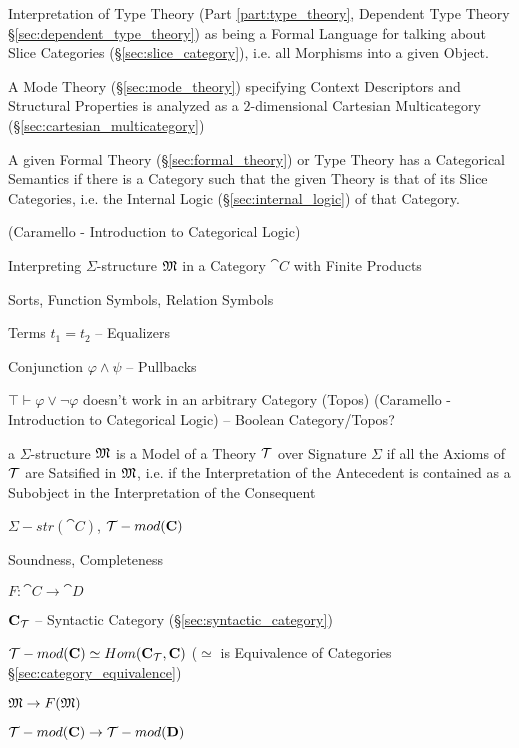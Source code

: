Interpretation of Type Theory (Part \ref{part:type_theory}, Dependent
Type Theory \S\ref{sec:dependent_type_theory}) as being a Formal
Language for talking about Slice Categories
(\S\ref{sec:slice_category}), i.e. all Morphisms into a given Object.

A Mode Theory (\S\ref{sec:mode_theory}) specifying Context Descriptors
and Structural Properties is analyzed as a $2$-dimensional Cartesian
Multicategory (\S\ref{sec:cartesian_multicategory})

A given Formal Theory (\S\ref{sec:formal_theory}) or Type Theory has a
Categorical Semantics if there is a Category such that the given
Theory is that of its Slice Categories, i.e. the Internal Logic
(\S\ref{sec:internal_logic}) of that Category.


\asterism


(Caramello - Introduction to Categorical Logic) %

Interpreting $\Sigma$-structure $\mathfrak{M}$ in a Category $\cat{C}$
with Finite Products

Sorts, Function Symbols, Relation Symbols

Terms $t_1 = t_2$ -- Equalizers

Conjunction $\varphi \wedge \psi$ -- Pullbacks

$\top \vdash \varphi \vee \neg\varphi$ doesn't work in an arbitrary
Category (Topos) (Caramello - Introduction to Categorical Logic) --
Boolean Category/Topos?

a $\Sigma$-structure $\mathfrak{M}$ is a Model of a Theory $\mathcal{T}$
over Signature $\Sigma$ if all the Axioms of $\mathcal{T}$ are Satsified
in $\mathfrak{M}$, i.e. if the Interpretation of the Antecedent is
contained as a Subobject in the Interpretation of the Consequent


$\Sigma-str(\cat{C})$, $\mathcal{T}-mod(\mathbf{C})$

Soundness, Completeness

$F : \cat{C} \rightarrow \cat{D}$

$\mathbf{C}_{\mathcal{T}}$ -- Syntactic Category
(\S\ref{sec:syntactic_category})

$\mathcal{T}-mod(\mathbf{C}) \simeq Hom(\mathbf{C}_{\mathcal{T}},\mathbf{C})$
($\simeq$ is Equivalence of Categories
\S\ref{sec:category_equivalence})

$\mathfrak{M} \rightarrow F(\mathfrak{M})$

$\mathcal{T}-mod(\mathbf{C}) \rightarrow \mathcal{T}-mod(\mathbf{D})$

